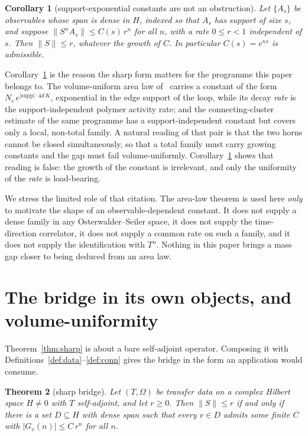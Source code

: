 \documentclass[11pt]{article}
\newtheorem{theorem}{Theorem}[section]
\newtheorem{corollary}[theorem]{Corollary}
\theoremstyle{definition}
\newcommand{\Om}{\Omega}
\begin{document}
\begin{corollary}[support-exponential constants are not an obstruction]
\label{cor:noobstruction}
Let $\{A_s\}$ be observables whose span is dense in $H$, indexed so that
$A_s$ has support of size $s$, and suppose $\|S^n A_s\| \le
C(s)\,r^n$ for all $n$, with a rate $0 \le r < 1$ independent of $s$.  Then
$\|S\| \le r$, whatever the growth of $C$.  In particular $C(s) =
e^{\kappa s}$ is admissible.
\end{corollary}

Corollary~\ref{cor:noobstruction} is the reason the sharp form matters
for the programme this paper belongs to.  The volume-uniform area
law of~\cite{ErikssonAreaLaw} carries a constant of the form
$N_c\,e^{|\mathrm{supp}| \cdot 4d\,K}$, exponential in the edge support
of the loop, while its decay \emph{rate} is the support-independent
polymer activity rate; and the connecting-cluster estimate of the same
programme has a support-independent constant but covers only a local,
non-total family.  A natural reading of that pair is that the two horns
cannot be closed simultaneously, so that a total family must carry
growing constants and the gap must fail volume-uniformly.
Corollary~\ref{cor:noobstruction} shows that reading is false: the growth
of the constant is irrelevant, and only the uniformity of the
\emph{rate} is load-bearing.

We stress the limited role of that citation.  The area-law theorem is used
here \emph{only} to motivate the shape of an observable-dependent
constant.  It does not supply a dense family in any Osterwalder--Seiler
space, it does not supply the time-direction correlator, it does not
supply a common rate on such a family, and it does not supply the
identification with $T^n$.  Nothing in this paper brings a mass gap closer
to being deduced from an area law.

\section{The bridge in its own objects, and volume-uniformity}
\label{sec:vu}

Theorem~\ref{thm:sharp} is about a bare self-adjoint operator.  Composing
it with Definitions~\ref{def:data}--\ref{def:conn} gives the bridge in
the form an application would consume.

\begin{theorem}[sharp bridge]
\label{thm:sharpbridge}
Let $(T,\Om)$ be transfer data on a complex Hilbert space $H \neq 0$ with
$T$ self-adjoint, and let $r \ge 0$.  Then $\|S\| \le r$ if and only if
there is a set $D \subseteq H$ with dense span such that every $v \in D$
admits some finite $C$ with $|G_v(n)| \le C\,r^n$ for all $n$.
\end{theorem}
\end{document}
